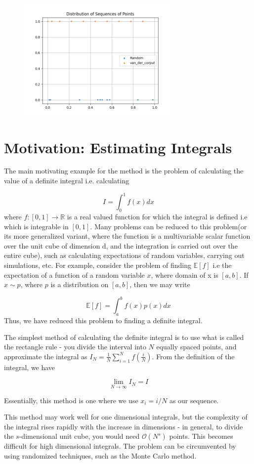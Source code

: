 \documentclass[12pt,letterpaper, twoside]{article}
\theoremstyle{definition}
\begin{document}
\begin{figure}[h]
\includegraphics[width=8cm]{images/van_der_corput.png}
\centering
 \end{figure}
 
 
 \section{Motivation: Estimating Integrals}
The main motivating example for the method is the problem of calculating the value of a definite integral i.e. calculating 

$$
I = \int_{0}^{1} f(x)dx
$$ where $f:[0,1] \to \mathbb{R}$ is a real valued function for which the integral is defined i.e which is integrable in $[0,1]$.
Many problems can be reduced to this problem(or its more generalized variant, where the function is a multivariable scalar function over the unit cube of dimension d, and the integration is carried out over the entire cube), such as calculating expectations of random variables, carrying out simulations, etc. For example, consider the problem of finding $\mathbb{E}[f]$ i.e the expectation of a function of a random variable $x$, where domain of x is $[a,b]$. If $x \sim p$, where $p$ is a distribution on $[a,b]$, then we may write  

$$
\mathbb{E}[f] = \int_{a}^{b}f(x)p(x)dx
$$ 
Thus, we have reduced this problem to finding a definite integral.

The simplest method of calculating the definite integral is to use what is called the rectangle rule - you divide the interval into $N$ equally spaced points, and approximate the integral as
$I_N = \frac{1}{N}\sum_{i=1}^{N}f(\frac{i}{N})$. From the definition of the integral, we have 

$$
\lim_{N \to \infty} I_N = I
$$

Essentially, this method is one where we use $x_i = i/N$ as our sequence.

This method may work well for one dimensional integrals, but the complexity of the integral rises rapidly with the increase in dimensions - in general, to divide the $s$-dimensional unit cube, you would need $\mathcal{O}(N^s)$ points. This becomes difficult for high dimensional integrals. The problem can be circumvented by using randomized techniques, such as the Monte Carlo method.
\end{document}
